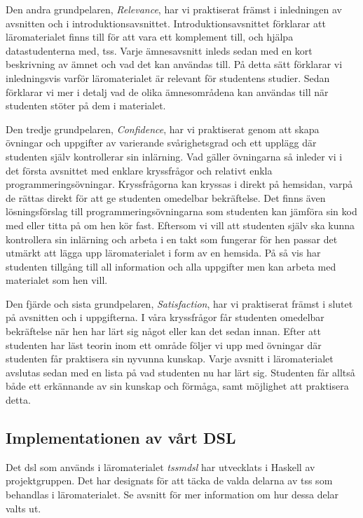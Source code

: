 \documentclass[12pt,a4paper,twoside,openright]{article}
\begin{document}
Den andra grundpelaren, \textit{Relevance}, har vi praktiserat främst
i inledningen av avsnitten och i introduktionsavsnittet.
Introduktionsavsnittet förklarar att läromaterialet finns till för att
vara ett komplement till, och hjälpa datastudenterna med,
\gls{tss}. Varje ämnesavsnitt inleds sedan med en kort beskrivning av
ämnet och vad det kan användas till. På detta sätt förklarar vi
inledningsvis varför läromaterialet är relevant för studentens
studier. Sedan förklarar vi mer i detalj vad de olika ämnesområdena
kan användas till när studenten stöter på dem i materialet.

Den tredje grundpelaren, \textit{Confidence}, har vi praktiserat genom
att skapa övningar och uppgifter av varierande svårighetsgrad och ett
upplägg där studenten själv kontrollerar sin inlärning. Vad gäller
övningarna så inleder vi i det första avsnittet med enklare
kryssfrågor och relativt enkla programmeringsövningar. Kryssfrågorna
kan kryssas i direkt på hemsidan, varpå de rättas direkt för att ge
studenten omedelbar bekräftelse. Det finns även lösningsförslag till
programmeringsövningarna som studenten kan jämföra sin kod med eller
titta på om hen kör fast. Eftersom vi vill att studenten själv ska
kunna kontrollera sin inlärning och arbeta i en takt som fungerar för
hen passar det utmärkt att lägga upp läromaterialet i form av en
hemsida. På så vis har studenten tillgång till all information och
alla uppgifter men kan arbeta med materialet som hen vill.

Den fjärde och sista grundpelaren, \textit{Satisfaction}, har vi
praktiserat främst i slutet på avsnitten och i uppgifterna. I våra
kryssfrågor får studenten omedelbar bekräftelse när hen har lärt sig
något eller kan det sedan innan. Efter att studenten har läst teorin
inom ett område följer vi upp med övningar där studenten får
praktisera sin nyvunna kunskap. Varje avsnitt i läromaterialet
avslutas sedan med en lista på vad studenten nu har lärt
sig. Studenten får alltså både ett erkännande av sin kunskap och
förmåga, samt möjlighet att praktisera detta.

\subsection{Implementationen av vårt DSL}
\label{sec:implDSL}
Det \gls{dsl} som används i läromaterialet \textit{\gls{tssmdsl}} har
utvecklats i Haskell av projektgruppen. Det har designats för att
täcka de valda delarna av \gls{tss} som behandlas i läromaterialet. Se
avsnitt  för mer information om hur
dessa delar valts ut.
\end{document}

